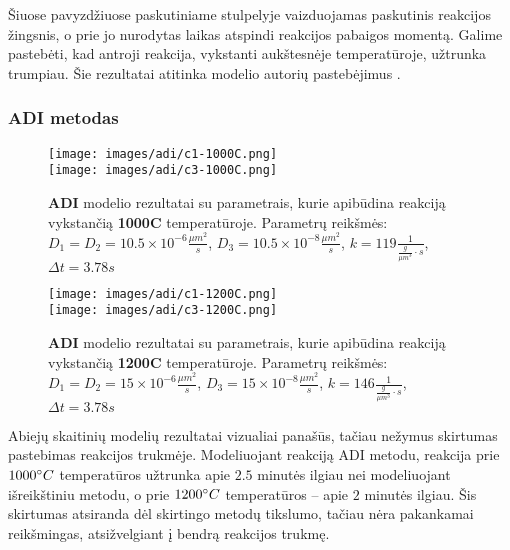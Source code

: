 Šiuose pavyzdžiuose paskutiniame stulpelyje vaizduojamas paskutinis reakcijos žingsnis, o prie jo nurodytas laikas atspindi reakcijos pabaigos momentą. Galime pastebėti, kad antroji reakcija, vykstanti aukštesnėje temperatūroje, užtrunka trumpiau. Šie rezultatai atitinka modelio autorių pastebėjimus \cite{mackeviciusCloserLookComputer2012}.

\subsubsection*{ADI metodas}

\begin{figure}[h!]
  \centering
  \texttt{[image: images/adi/c1-1000C.png]} \\ 
  \texttt{[image: images/adi/c3-1000C.png]}
  \caption{\textbf{ADI} modelio rezultatai su parametrais, kurie apibūdina reakciją vykstančią \textbf{1000\degree C} temperatūroje. Parametrų reikšmės: $D_1 = D_2 = 10.5\times 10^{-6} \frac{\mu m^2}{s}$, $D_3 = 10.5\times 10^{-8} \frac{\mu m^2}{s}$, $k = 119 \frac{1}{ \frac{g}{\mu m^3}\cdot s}$, $\Delta t = 3.78s$}
  \label{fig:adi-result-T-1000}
\end{figure}

\begin{figure}[h!]
  \centering
  \texttt{[image: images/adi/c1-1200C.png]} \\ 
  \texttt{[image: images/adi/c3-1200C.png]}
  \caption{\textbf{ADI} modelio rezultatai su parametrais, kurie apibūdina reakciją vykstančią \textbf{1200\degree C} temperatūroje. Parametrų reikšmės: $D_1 = D_2 = 15\times 10^{-6} \frac{\mu m^2}{s}$, $D_3 = 15\times 10^{-8} \frac{\mu m^2}{s}$, $k = 146 \frac{1}{ \frac{g}{\mu m^3}\cdot s}$, $\Delta t = 3.78s$}
  \label{fig:adi-result-T-1200}
\end{figure}

Abiejų skaitinių modelių rezultatai vizualiai panašūs, tačiau nežymus skirtumas pastebimas reakcijos trukmėje. Modeliuojant reakciją ADI metodu, reakcija prie $1000\degree C$ temperatūros užtrunka apie $2.5$ minutės ilgiau nei modeliuojant išreikštiniu metodu, o prie $1200\degree C$ temperatūros -- apie $2$ minutės ilgiau. Šis skirtumas atsiranda dėl skirtingo metodų tikslumo, tačiau nėra pakankamai reikšmingas, atsižvelgiant į bendrą reakcijos trukmę.
